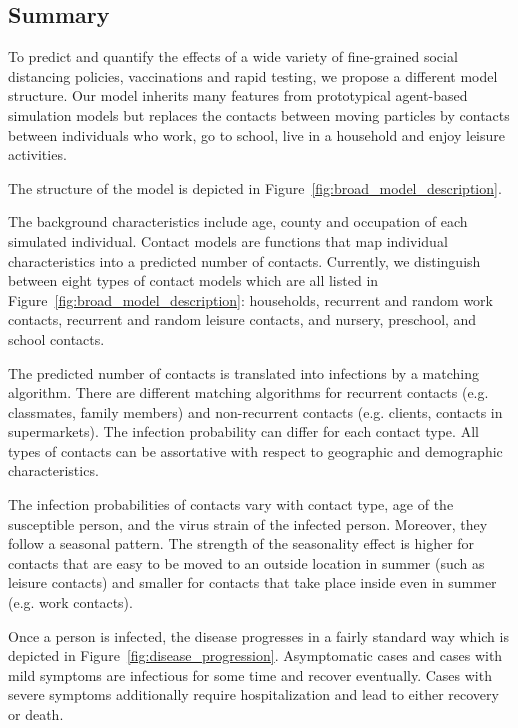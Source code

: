 \subsection{Summary}
\label{sub:model_summary}

To predict and quantify the effects of a wide variety of fine-grained social distancing
policies, vaccinations and rapid testing, we propose a different model structure. Our
model inherits many features from prototypical agent-based simulation models but
replaces the contacts between moving particles by contacts between individuals who work,
go to school, live in a household and enjoy leisure activities.

The structure of the model is depicted in Figure~\ref{fig:broad_model_description}.

The background characteristics include age, county and occupation of each simulated
individual. Contact models are functions that map individual characteristics into a
predicted number of contacts. Currently, we distinguish between eight types of contact
models which are all listed in Figure~\ref{fig:broad_model_description}: households,
recurrent and random work contacts, recurrent and random leisure contacts, and nursery,
preschool, and school contacts.

The predicted number of contacts is translated into infections by a matching algorithm.
There are different matching algorithms for recurrent contacts (e.g. classmates, family
members) and non-recurrent contacts (e.g. clients, contacts in supermarkets). The
infection probability can differ for each contact type. All types of contacts can be
assortative with respect to geographic and demographic characteristics.

The infection probabilities of contacts vary with contact type, age of the susceptible
person, and the virus strain of the infected person. Moreover, they follow a seasonal
pattern. The strength of the seasonality effect is higher for contacts that are easy to
be moved to an outside location in summer (such as leisure contacts) and smaller for
contacts that take place inside even in summer (e.g. work contacts).

Once a person is infected, the disease progresses in a fairly standard way which is
depicted in Figure~\ref{fig:disease_progression}. Asymptomatic cases and cases with mild
symptoms are infectious for some time and recover eventually. Cases with severe symptoms
additionally require hospitalization and lead to either recovery or death.

